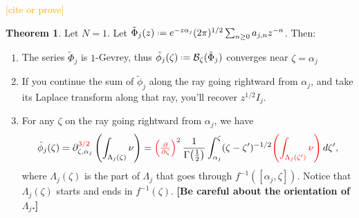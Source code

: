 \documentclass{article}
\theoremstyle{definition}
\newcommand{\series}[1]{\tilde{#1}}
\newcommand{\fracderiv}[3]{\partial^{#1}_{#2, #3}}
\newcommand*{\defeq}{\mathrel{\vcenter{\baselineskip0.5ex \lineskiplimit0pt
                     \hbox{\scriptsize.}\hbox{\scriptsize.}}}%
                     =}
\newcommand{\borel}{\mathcal{B}}
\newtheorem{theorem}{Theorem}[section]
\begin{document}
\textcolor{orange}{[cite or prove]}


\begin{theorem}\label{thm:maxim} Let $N=1$. Let $\tilde{\Phi}_{j}(z)\defeq e^{-z\alpha_j}(2\pi)^{1/2} \sum_{n\geq 0}a_{j,n}z^{-n}$. Then:
\begin{enumerate}
\item\label{int:series-gevrey} The series $\tilde{\Phi}_j$ is $1$-Gevrey, thus $\series{\phi}_j(\zeta)\defeq\borel_\zeta(\tilde{\Phi}_j)$ converges near $\zeta=\alpha_j$
\item\label{int:resum-valid} If you continue the sum of $\tilde{\phi}_j$ along the ray going rightward from $\alpha_j$, and take its Laplace transform along that ray, you'll recover $z^{1/2} I_j$.
\item\label{int:deriv-formula} For any $\zeta$ on the ray going rightward from $\alpha_j$, we have
\begin{multline}\label{formula1}
\hat{\phi}_{j}(\zeta)=\fracderiv{\textcolor{red}{3/2}}{\zeta} {\alpha_j} \left( \int_{\Lambda_j(\zeta)}\nu \right)=\textcolor{red}{\left(\tfrac{\partial}{\partial \zeta}\right)^2}\,\frac{1}{\Gamma\big(\tfrac{1}{2}\big)} \int_{\alpha_j}^\zeta (\zeta-\zeta')^{-1/2} \textcolor{red}{\left( \int_{\Lambda_j(\zeta')} \nu \right)}\,d\zeta',
\end{multline}
where $\Lambda_j(\zeta)$ is the part of $\Lambda_j$ that goes through $f^{-1}([\alpha_j, \zeta])$. Notice that $\Lambda_j(\zeta)$ starts and ends in $f^{-1}(\zeta)$. \textbf{[Be careful about the orientation of $\Lambda_j$.]}
\end{enumerate}
\end{theorem}
\end{document}
